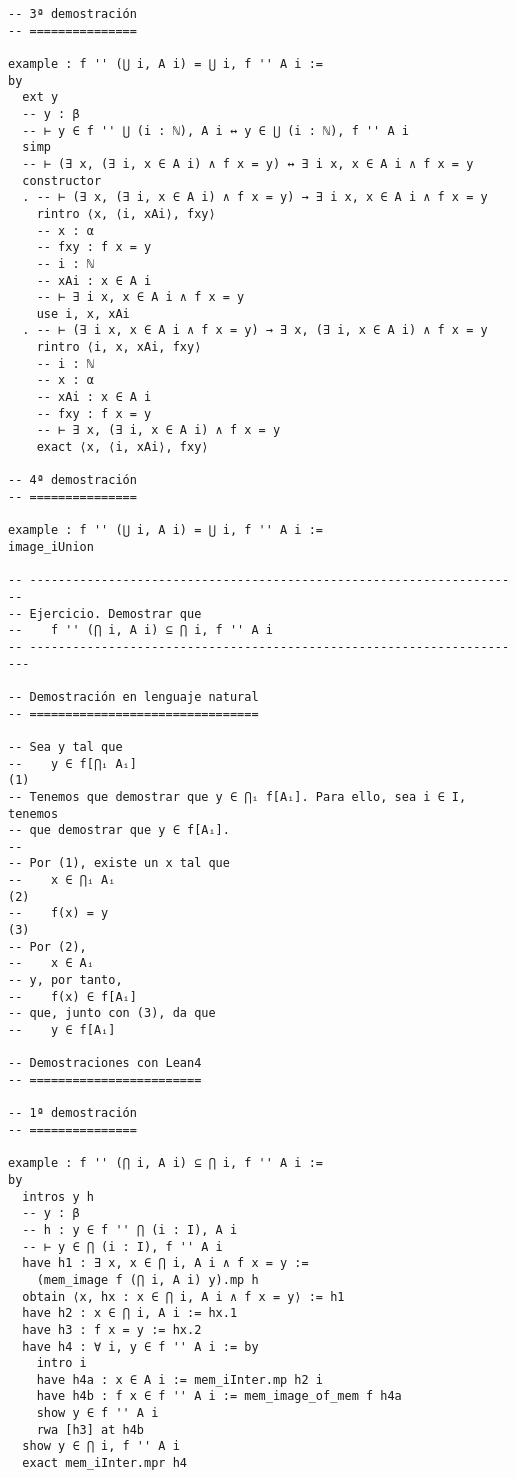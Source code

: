 \begin{verbatim}
-- 3ª demostración
-- ===============

example : f '' (⋃ i, A i) = ⋃ i, f '' A i :=
by
  ext y
  -- y : β
  -- ⊢ y ∈ f '' ⋃ (i : ℕ), A i ↔ y ∈ ⋃ (i : ℕ), f '' A i
  simp
  -- ⊢ (∃ x, (∃ i, x ∈ A i) ∧ f x = y) ↔ ∃ i x, x ∈ A i ∧ f x = y
  constructor
  . -- ⊢ (∃ x, (∃ i, x ∈ A i) ∧ f x = y) → ∃ i x, x ∈ A i ∧ f x = y
    rintro ⟨x, ⟨i, xAi⟩, fxy⟩
    -- x : α
    -- fxy : f x = y
    -- i : ℕ
    -- xAi : x ∈ A i
    -- ⊢ ∃ i x, x ∈ A i ∧ f x = y
    use i, x, xAi
  . -- ⊢ (∃ i x, x ∈ A i ∧ f x = y) → ∃ x, (∃ i, x ∈ A i) ∧ f x = y
    rintro ⟨i, x, xAi, fxy⟩
    -- i : ℕ
    -- x : α
    -- xAi : x ∈ A i
    -- fxy : f x = y
    -- ⊢ ∃ x, (∃ i, x ∈ A i) ∧ f x = y
    exact ⟨x, ⟨i, xAi⟩, fxy⟩

-- 4ª demostración
-- ===============

example : f '' (⋃ i, A i) = ⋃ i, f '' A i :=
image_iUnion

-- ---------------------------------------------------------------------
-- Ejercicio. Demostrar que
--    f '' (⋂ i, A i) ⊆ ⋂ i, f '' A i
-- ----------------------------------------------------------------------

-- Demostración en lenguaje natural
-- ================================

-- Sea y tal que
--    y ∈ f[⋂ᵢ Aᵢ]                                                   (1)
-- Tenemos que demostrar que y ∈ ⋂ᵢ f[Aᵢ]. Para ello, sea i ∈ I, tenemos
-- que demostrar que y ∈ f[Aᵢ].
--
-- Por (1), existe un x tal que
--    x ∈ ⋂ᵢ Aᵢ                                                      (2)
--    f(x) = y                                                       (3)
-- Por (2),
--    x ∈ Aᵢ
-- y, por tanto,
--    f(x) ∈ f[Aᵢ]
-- que, junto con (3), da que
--    y ∈ f[Aᵢ]

-- Demostraciones con Lean4
-- ========================

-- 1ª demostración
-- ===============

example : f '' (⋂ i, A i) ⊆ ⋂ i, f '' A i :=
by
  intros y h
  -- y : β
  -- h : y ∈ f '' ⋂ (i : I), A i
  -- ⊢ y ∈ ⋂ (i : I), f '' A i
  have h1 : ∃ x, x ∈ ⋂ i, A i ∧ f x = y :=
    (mem_image f (⋂ i, A i) y).mp h
  obtain ⟨x, hx : x ∈ ⋂ i, A i ∧ f x = y⟩ := h1
  have h2 : x ∈ ⋂ i, A i := hx.1
  have h3 : f x = y := hx.2
  have h4 : ∀ i, y ∈ f '' A i := by
    intro i
    have h4a : x ∈ A i := mem_iInter.mp h2 i
    have h4b : f x ∈ f '' A i := mem_image_of_mem f h4a
    show y ∈ f '' A i
    rwa [h3] at h4b
  show y ∈ ⋂ i, f '' A i
  exact mem_iInter.mpr h4


\end{verbatim}
